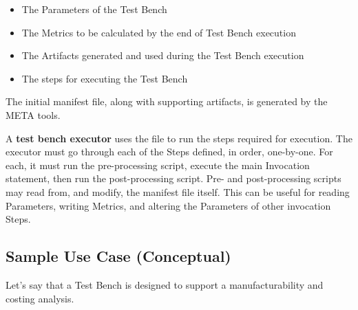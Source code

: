 \documentclass{article}
\begin{document}
\begin{itemize}
\item The Parameters of the Test Bench
\item The Metrics to be calculated by the end of Test Bench execution
\item The Artifacts generated and used during the Test Bench execution
\item The steps for executing the Test Bench
\end{itemize}

The initial manifest file, along with supporting artifacts, is generated by the META tools.

A \textbf{test bench executor} uses the file to run the steps required for execution. The executor must go through each of the Steps defined, in order, one-by-one. For each, it must run the pre-processing script, execute the main Invocation statement, then run the post-processing script. Pre- and post-processing scripts may read from, and modify, the manifest file itself. This can be useful for reading Parameters, writing Metrics, and altering the Parameters of other invocation Steps.

\subsection{Sample Use Case (Conceptual)}
Let's say that a Test Bench is designed to support a manufacturability and costing analysis.
\end{document}
